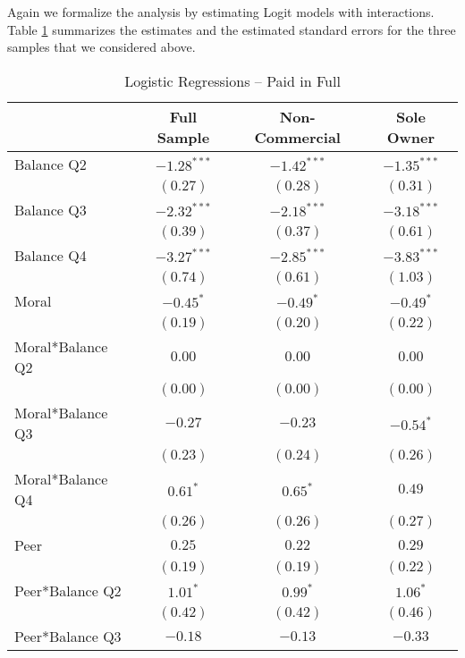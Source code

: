 \documentclass[12pt,titlepage]{article}
\begin{document}
Again we formalize the analysis by estimating Logit models with
interactions.  Table \ref{WW} summarizes the estimates and the
estimated standard errors for the three samples that we considered
above.

\begin{table}[htbp]
\caption{Logistic Regressions -- Paid in Full}\label{WW}
{\footnotesize
\begin{center}
\begin{tabular}{l c c c }
\hline
                  & Full Sample & Non-Commercial & Sole Owner \\
\hline
Balance Q2        & $-1.28^{***}$ & $-1.42^{***}$ & $-1.35^{***}$ \\
                  & $(0.27)$      & $(0.28)$      & $(0.31)$      \\
Balance Q3        & $-2.32^{***}$ & $-2.18^{***}$ & $-3.18^{***}$ \\
                  & $(0.39)$      & $(0.37)$      & $(0.61)$      \\
Balance Q4        & $-3.27^{***}$ & $-2.85^{***}$ & $-3.83^{***}$ \\
                  & $(0.74)$      & $(0.61)$      & $(1.03)$      \\
Moral             & $-0.45^{*}$   & $-0.49^{*}$   & $-0.49^{*}$   \\
                  & $(0.19)$      & $(0.20)$      & $(0.22)$      \\
Moral*Balance Q2  & $0.00$        & $0.00$        & $0.00$        \\
                  & $(0.00)$      & $(0.00)$      & $(0.00)$      \\
Moral*Balance Q3  & $-0.27$       & $-0.23$       & $-0.54^{*}$   \\
                  & $(0.23)$      & $(0.24)$      & $(0.26)$      \\
Moral*Balance Q4  & $0.61^{*}$    & $0.65^{*}$    & $0.49$        \\
                  & $(0.26)$      & $(0.26)$      & $(0.27)$      \\
Peer              & $0.25$        & $0.22$        & $0.29$        \\
                  & $(0.19)$      & $(0.19)$      & $(0.22)$      \\
Peer*Balance Q2   & $1.01^{*}$    & $0.99^{*}$    & $1.06^{*}$    \\
                  & $(0.42)$      & $(0.42)$      & $(0.46)$      \\
Peer*Balance Q3   & $-0.18$       & $-0.13$       & $-0.33$       \\

\end{tabular}
\end{center}}
\end{table}
\end{document}
